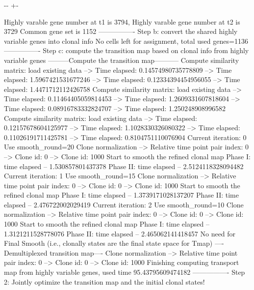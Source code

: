 \documentclass[letterpaper,10pt,english]{sphinxmanual}
\newlength\nbsphinxcodecellspacing
\begin{document}
{

\kern-\sphinxverbatimsmallskipamount\kern-\baselineskip
\kern+\FrameHeightAdjust\kern-\fboxrule
\vspace{\nbsphinxcodecellspacing}

\begin{sphinxVerbatim}[commandchars=\\\{\}]
Highly varable gene number at t1 is 3794, Highly varable gene number at t2 is 3729
Common gene set is 1152
----------------
Step b: convert the shared highly variable genes into clonal info
No cells left for assignment, total used genes=1136
----------------
Step c: compute the transition map based on clonal info from highly variable genes
---------Compute the transition map-----------
Compute similarity matrix: load existing data
--> Time elapsed:  0.14574980735778809
--> Time elapsed:  1.5967421531677246
--> Time elapsed:  0.12334394454956055
--> Time elapsed:  1.4471712112426758
Compute similarity matrix: load existing data
--> Time elapsed:  0.11464405059814453
--> Time elapsed:  1.2609331607818604
--> Time elapsed:  0.08916783332824707
--> Time elapsed:  1.250248908996582
Compute similarity matrix: load existing data
--> Time elapsed:  0.12157678604125977
--> Time elapsed:  1.1028330326080322
--> Time elapsed:  0.11026191711425781
--> Time elapsed:  0.8104751110076904
Current iteration: 0
Use smooth\_round=20
Clone normalization
--> Relative time point pair index: 0
--> Clone id: 0
--> Clone id: 1000
Start to smooth the refined clonal map
Phase I: time elapsed --  1.530857801437378
Phase II: time elapsed --  2.5124118328094482
Current iteration: 1
Use smooth\_round=15
Clone normalization
--> Relative time point pair index: 0
--> Clone id: 0
--> Clone id: 1000
Start to smooth the refined clonal map
Phase I: time elapsed --  1.3739171028137207
Phase II: time elapsed --  2.476722002029419
Current iteration: 2
Use smooth\_round=10
Clone normalization
--> Relative time point pair index: 0
--> Clone id: 0
--> Clone id: 1000
Start to smooth the refined clonal map
Phase I: time elapsed --  1.3121211528778076
Phase II: time elapsed --  2.465062141418457
No need for Final Smooth (i.e., clonally states are the final state space for Tmap)
----Demultiplexed transition map----
Clone normalization
--> Relative time point pair index: 0
--> Clone id: 0
--> Clone id: 1000
Finishing computing transport map from highly variable genes, used time 95.43795609474182
----------------
Step 2: Jointly optimize the transition map and the initial clonal states!

\end{sphinxVerbatim}}
\end{document}

